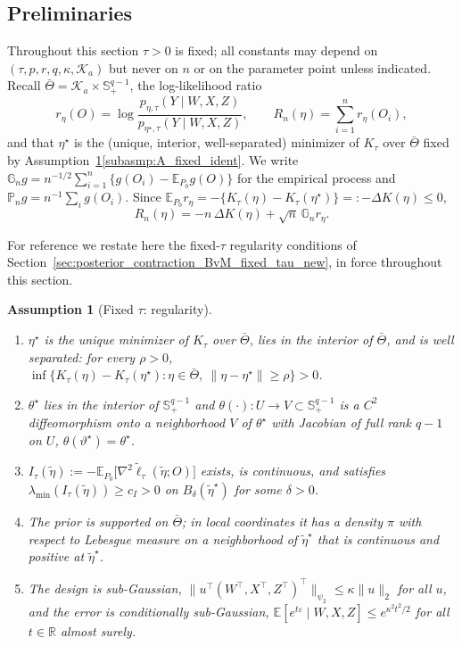 \documentclass[11pt]{article}
\newtheorem{assumption}{Assumption}
\theoremstyle{definition}
\theoremstyle{plain}
\newcommand{\E}{\mathbb{E}}
\newcommand{\R}{\mathbb{R}}
\begin{document}
\subsection{Preliminaries}

Throughout this section $\tau>0$ is fixed; all constants may depend on $(\tau,p,r,q,\kappa,\mathcal K_a)$ but never on $n$ or on the parameter point unless indicated. Recall $\bar\Theta=\mathcal K_a\times\mathbb S^{q-1}_+$, the log-likelihood ratio
\[
r_\eta(O)=\log\frac{p_{\eta,\tau}(Y\mid W,X,Z)}{p_{\eta^\star,\tau}(Y\mid W,X,Z)},
\qquad
R_n(\eta)=\sum_{i=1}^n r_\eta(O_i),
\]
and that $\eta^\star$ is the (unique, interior, well-separated) minimizer of $K_\tau$ over $\bar\Theta$ fixed by Assumption~\ref{asmp:A_fixed_tau}\ref{subasmp:A_fixed_ident}. We write $\mathbb G_n g=n^{-1/2}\sum_{i=1}^n\{g(O_i)-\E_{P_0}g(O)\}$ for the empirical process and $\mathbb P_ng=n^{-1}\sum_ig(O_i)$. Since $\E_{P_0}r_\eta=-\{K_\tau(\eta)-K_\tau(\eta^\star)\}=:-\Delta K(\eta)\le0$,
\begin{equation}
R_n(\eta)=-n\,\Delta K(\eta)+\sqrt n\,\mathbb G_n r_\eta .
\label{eq:Rn_decomp}
\end{equation}

For reference we restate here the fixed-$\tau$ regularity conditions of Section~\ref{sec:posterior_contraction_BvM_fixed_tau_new}, in force throughout this section.

\begin{assumption}[Fixed $\tau$: regularity]
\label{asmp:A_fixed_tau}
\leavevmode
\begin{enumerate}[label=(\roman*),nosep]
\item \label{subasmp:A_fixed_ident}
$\eta^\star$ is the unique minimizer of $K_\tau$ over $\bar\Theta$, lies in the interior of $\bar\Theta$, and is well separated: for every $\rho>0$, $\inf\{K_\tau(\eta)-K_\tau(\eta^\star):\eta\in\bar\Theta,\ \|\eta-\eta^\star\|\ge\rho\}>0$.
\item \label{subasmp:A_fixed_chart}
$\theta^\star$ lies in the interior of $\mathbb S^{q-1}_+$ and $\theta(\cdot):U\to V\subset\mathbb S^{q-1}_+$ is a $C^2$ diffeomorphism onto a neighborhood $V$ of $\theta^\star$ with Jacobian of full rank $q-1$ on $U$, $\theta(\vartheta^\star)=\theta^\star$.
\item \label{subasmp:A_fixed_curv}
$I_\tau(\tilde\eta):=-\E_{P_0}\big[\nabla^2\tilde\ell_\tau(\tilde\eta;O)\big]$ exists, is continuous, and satisfies $\lambda_{\min}(I_\tau(\tilde\eta))\ge c_I>0$ on $B_\delta(\tilde\eta^\star)$ for some $\delta>0$.
\item \label{subasmp:A_fixed_prior}
The prior is supported on $\bar\Theta$; in local coordinates it has a density $\pi$ with respect to Lebesgue measure on a neighborhood of $\tilde\eta^\star$ that is continuous and positive at $\tilde\eta^\star$.
\item \label{subasmp:A_fixed_tails}
The design is sub-Gaussian, $\|u^\top(W^\top,X^\top,Z^\top)^\top\|_{\psi_2}\le\kappa\|u\|_2$ for all $u$, and the error is conditionally sub-Gaussian, $\E[e^{t\varepsilon}\mid W,X,Z]\le e^{\kappa^2t^2/2}$ for all $t\in\R$ almost surely.
\end{enumerate}
\end{assumption}
\end{document}
